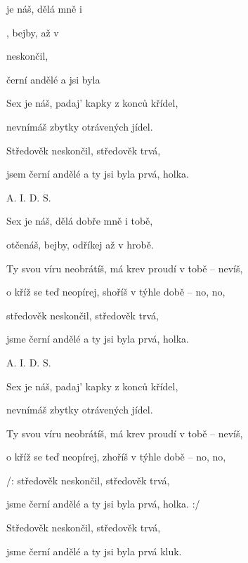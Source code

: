 

           

\zs
{} je náš, dělá  mně i 

, bejby,  až v 

 neskončil,  

 černí andělé a  jsi byla   
 
\ks

\zs
Sex je náš, padaj' kapky z konců křídel,

nevnímáš zbytky otrávených jídel.

Středověk neskončil, středověk trvá,

jsem černí andělé a ty jsi byla prvá, holka.
\ks

A. I. D. S.

\zs
Sex je náš, dělá dobře mně i tobě,

otčenáš, bejby, odříkej až v hrobě.

Ty svou víru neobrátíš, má krev proudí v tobě -- nevíš,

o kříž se teď neopírej, shoříš v týhle době -- no, no,

středověk neskončil, středověk trvá,

jsme černí andělé a ty jsi byla prvá, holka.
\ks

A. I. D. S.

\zs
Sex je náš, padaj' kapky z konců křídel,

nevnímáš zbytky otrávených jídel.

Ty svou víru neobrátíš, má krev proudí v tobě -- nevíš,

o kříž se teď neopírej, zhoříš v týhle době -- no, no,

/: středověk neskončil, středověk trvá,

jsme černí andělé a ty jsi byla prvá, holka. :/

Středověk neskončil, středověk trvá,

jsme černí andělé a ty jsi byla prvá kluk.
\ks

\kp






